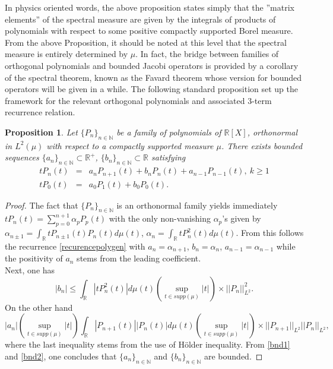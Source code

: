 \documentclass[a4paper,11pt,twoside]{article}
\numberwithin{equation}{section}
\newtheorem{proposition}[Theorem]{Proposition}
\theoremstyle{nonumberplain}
\newtheorem{proof}{Proof}
\begin{document}
In physics oriented words, the above proposition states simply that the ''matrix elements'' of the spectral measure are given by the integrals of products of polynomials with respect to some positive compactly supported Borel measure. \\
From the above Proposition, it should be noted at this level that the spectral measure is entirely determined by $\mu$. In fact, the bridge between families of orthogonal polynomials and bounded Jacobi operators is provided by a corollary of the spectral theorem, known as the Favard theorem whose version for bounded operators will be given in a while. The following standard proposition set up the framework for the relevant orthogonal polynomials and associated 3-term recurrence relation.
\begin{proposition}\label{recur-poly}
Let $\{P_n\}_{n\in\mathbb{N}}$ be a family of polynomials of $\mathbb{R}[X]$, orthonormal in $L^2(\mu)$ with respect to a compactly supported measure $\mu$. There exists bounded sequences $\{a_n\}_{n\in\mathbb{N}}\subset\mathbb{R}^+$, $\{b_n\}_{n\in\mathbb{N}}\subset\mathbb{R}$ satisfying
\begin{eqnarray}
tP_n(t)&=&a_nP_{n+1}(t)+b_nP_n(t)+a_{n-1}P_{n-1}(t),\ k\ge1\nonumber\\
tP_0(t)&=&a_0P_1(t)+b_0P_0(t)\label{recurencepolygen}.
\end{eqnarray}
\end{proposition}
\begin{proof}
The fact that $\{P_n\}_{n\in\mathbb{N}}$ is an orthonormal family yields immediately $tP_n(t)=\sum_{p=0}^{n+1}\alpha_pP_p(t)$ with the only non-vanishing $\alpha_p$'s given by $\alpha_{n\pm1}=\int_\mathbb{R}tP_{n\pm1}(t)P_{n}(t)d\mu(t)$, $\alpha_n=\int_{\mathbb{R}}tP_n^2(t)d\mu(t)$. From this follows the recurrence \eqref{recurencepolygen} with $a_n=\alpha_{n+1}$, $b_n=\alpha_n$, $a_{n-1}=\alpha_{n-1}$ while the positivity of $a_n$ stems from the leading coefficient. \\
Next, one has 
\begin{equation}
|b_n|\le\int_\mathbb{R}|tP_n^2(t)|d\mu(t)\left(\sup_{t\in supp(\mu)}|t|\right)\times||P_n||^2_{L^2}\label{bnd1}. 
\end{equation}
On the other hand 
\begin{equation}
|a_n|\left(\sup_{t\in supp(\mu)}|t|\right)\int_\mathbb{R}|P_{n+1}(t)||P_n(t)|d\mu(t)\left(\sup_{t\in supp(\mu)}|t|\right)\times||P_{n+1}||_{L^2} ||P_n||_{L^2},\label{bnd2}
\end{equation}
where the last inequality stems from the use of H\"older inequality. From \eqref{bnd1} and \eqref{bnd2}, one concludes that $\{a_n\}_{n\in\mathbb{N}}$ and $\{b_n\}_{n\in\mathbb{N}}$ are bounded.
\end{proof}
\end{document}
